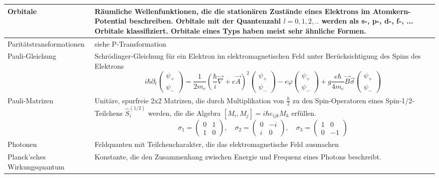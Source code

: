 \documentclass{article}
\newcommand{\lr}[1]{\left(#1\right)}
\begin{document}
\begin{xltabular}{\linewidth}{l|X}
	\hline
		Orbitale & Räumliche Wellenfunktionen, die die stationären Zustände eines Elektrons im Atomkern-Potential beschreiben. Orbitale mit der Quantenzahl $l=0,1,2,..$ werden als s-, p-, d-, f-, ... Orbitale klassifiziert. Orbitale eines Typs haben meist sehr ähnliche Formen.\\
	\hline
		Paritätstransformationen & siehe P-Transformation \\
	\hline
		Pauli-Gleichung & Schrödinger-Gleichung für ein Elektron im elektromagnetischen Feld unter
Berücksichtigung des Spins des Elektrons
 		$$i\hbar\partial_t 
 		\begin{pmatrix}
 			\psi_+\\
	 		\psi_-
	 	\end{pmatrix}
	 	= \frac{1}{2m_e} \lr{\frac{\hbar}{i}\vec{\nabla} + e\vec{A}}^2
	 	\begin{pmatrix}
 			\psi_+\\
	 		\psi_-
	 	\end{pmatrix}
	 	- e\varphi
	 	\begin{pmatrix}
 			\psi_+\\
	 		\psi_-
	 	\end{pmatrix}
	 	+ g\frac{e\hbar}{4m_e}\vec{B}\vec{\sigma}
	 	\begin{pmatrix}
 			\psi_+\\
	 		\psi_-
	 	\end{pmatrix}$$\\
	\hline
		Pauli-Matrizen & Unitäre, spurfreie 2x2 Matrizen, die durch Multiplikation von $\frac{\hbar}{2}$ zu den Spin-Operatoren eines Spin-1/2-Teilchens $\hat{S}_i^{(1/2)}$ werden, die die Algebra $[M_i, M_j] = i\hbar e_{ijk} M_k$ erfüllen.
			$$\sigma_1 =
			\begin{pmatrix}
				0 & 1\\
				1 & 0
			\end{pmatrix},\quad
			\sigma_2 =
			\begin{pmatrix}
				0 & -i\\
				i & 0
			\end{pmatrix}, \quad
			\sigma_3 =
			\begin{pmatrix}
				1 & 0\\
				0 & -1
			\end{pmatrix}$$\\
	\hline
		Photonen & Feldquanten mit Teilchencharakter, die das elektromagnetische Feld ausmachen \\
	\hline
		Planck'sches Wirkungsquantum & Konstante, die den Zusammenhang zwischen Energie und Frequenz eines Photons beschreibt.

\end{xltabular}
\end{document}
